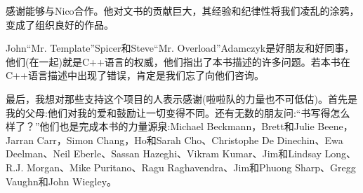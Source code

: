 感谢能够与Nico合作。他对文书的贡献巨大，其经验和纪律性将我们凌乱的涂鸦，变成了组织良好的作品。

John“Mr. Template”Spicer和Steve“Mr. Overload”Adamczyk是好朋友和好同事，他们(在一起)就是C++语言的权威，他们指出了本书描述的许多问题。若本书在C++语言描述中出现了错误，肯定是我们忘了向他们咨询。

最后，我想对那些支持这个项目的人表示感谢(啦啦队的力量也不可低估)。首先是我的父母:他们对我的爱和鼓励让一切变得不同。还有无数的朋友问:“书写得怎么样了？”他们也是完成本书的力量源泉:Michael Beckmann，Brett和Julie Beene，Jarran Carr，Simon Chang，Ho和Sarah Cho、Christophe De Dinechin、Ewa Deelman、Neil Eberle、Sassan Hazeghi、Vikram Kumar、Jim和Lindsay Long、R.J. Morgan、Mike Puritano、Ragu Raghavendra、Jim和Phuong Sharp、Gregg Vaughn和John Wiegley。



